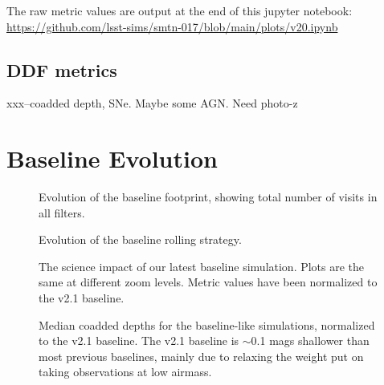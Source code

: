 The raw metric values are output at the end of this jupyter notebook: \url{https://github.com/lsst-sims/smtn-017/blob/main/plots/v20.ipynb}

\subsection{DDF metrics}

xxx--coadded depth, SNe. Maybe some AGN. Need photo-z


\section{Baseline Evolution}


\begin{figure}
\caption{Evolution of the baseline footprint, showing total number of visits in all filters.\label{fig:baseline_foot}}
\end{figure}

\begin{figure}
\caption{Evolution of the baseline rolling strategy. \label{fig:baseline_roll}}
\end{figure}

\begin{figure}
\caption{The science impact of our latest baseline simulation. Plots are the same at different zoom levels. Metric values have been normalized to the v2.1 baseline.  \label{fig:baseline2_radar}}
\end{figure}

\begin{figure}
\caption{Median coadded depths for the baseline-like simulations, normalized to the v2.1 baseline. The v2.1 baseline is $\sim$0.1 mags shallower than most previous baselines, mainly due to relaxing the weight put on taking observations at low airmass. \label{fig:baseline_mags}}
\end{figure}

